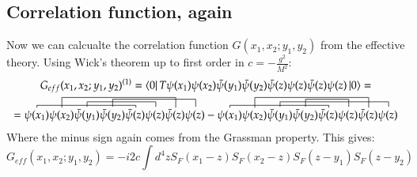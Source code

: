 \documentclass{article}
\begin{document}
\subsection{Correlation function, again}
Now we can calcualte the correlation function $G(x_1, x_2; y_1, y_2)$ from the effective theory. Using Wick's theorem up to first order in $c = -\frac{g^2}{M^2}$:
\begin{equation}
\begin{gathered}
    G_{eff}(x_1, x_2; y_1, y_2)^{(1)} = \bra{0}T\psi(x_1)\psi(x_2)\bar{\psi}(y_1)\bar{\psi}(y_2)\bar{\psi}(z)\psi(z)\bar{\psi}(z)\psi(z)\ket{0} = \\ =
    \contraction[0.5ex]{}{\psi(x_1)}{\psi(x_2)\bar{\psi}(y_1)\bar{\psi}(y_2)}{\bar{\psi}(z)}
    \contraction[2ex]{\psi(x_1)}{\psi(x_2)}{\bar{\psi}(y_1)\bar{\psi}(y_2)\bar{\psi}(z)\psi(z)}{\bar{\psi}(z)}
    \contraction{\psi(x_1)\psi(x_2)}{\bar{\psi}(y_1)}{\bar{\psi}(y_2)\bar{\psi}(z)}{\psi(z)}
    \contraction[1.5ex]{\psi(x_1)\psi(x_2)\bar{\psi}(y_1)}{\bar{\psi}(y_2)}{\bar{\psi}(z)\psi(z)\bar{\psi}(z)}{\psi(z)}
    \psi(x_1)\psi(x_2)\bar{\psi}(y_1)\bar{\psi}(y_2)\bar{\psi}(z)\psi(z)\bar{\psi}(z)\psi(z)
    -
    \contraction[0.5ex]{}{\psi(x_1)}{\psi(x_2)\bar{\psi}(y_1)\bar{\psi}(y_2)}{\bar{\psi}(z)}
    \contraction[2ex]{\psi(x_1)}{\psi(x_2)}{\bar{\psi}(y_1)\bar{\psi}(y_2)\bar{\psi}(z)\psi(z)}{\bar{\psi}(z)}
    \contraction{\psi(x_1)\psi(x_2)}{\bar{\psi}(y_1)}{\bar{\psi}(y_2)\bar{\psi}(z)\psi(z)\bar{\psi}(z)}{\psi(z)}
    \contraction[1.5ex]{\psi(x_1)\psi(x_2)\bar{\psi}(y_1)}{\bar{\psi}(y_2)}{\bar{\psi}(z)}{\psi(z)}
    \psi(x_1)\psi(x_2)\bar{\psi}(y_1)\bar{\psi}(y_2)\bar{\psi}(z)\psi(z)\bar{\psi}(z)\psi(z)
\end{gathered}
\end{equation}
Where the minus sign again comes from the Grassman property. This gives:
\begin{equation}
    G_{eff}(x_1, x_2; y_1, y_2) = -i2c \int d^4z 
        S_F(x_1 - z)S_F(x_2 - z)S_F(z - y_1)S_F(z - y_2)
\end{equation}
\end{document}
